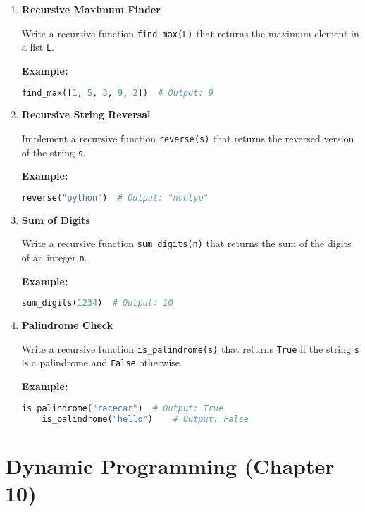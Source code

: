 \documentclass{article}
\begin{document}
\begin{enumerate}
    \item \textbf{Recursive Maximum Finder}

    Write a recursive function \texttt{find\_max(L)} that returns the maximum element in a list \texttt{L}.

    \textbf{Example:}
    \begin{lstlisting}[language=Python]
    find_max([1, 5, 3, 9, 2])  # Output: 9
    \end{lstlisting}

    \item \textbf{Recursive String Reversal}

    Implement a recursive function \texttt{reverse(s)} that returns the reversed version of the string \texttt{s}.

    \textbf{Example:}
    \begin{lstlisting}[language=Python]
    reverse("python")  # Output: "nohtyp"
    \end{lstlisting}

    \item \textbf{Sum of Digits}

    Write a recursive function \texttt{sum\_digits(n)} that returns the sum of the digits of an integer \texttt{n}.

    \textbf{Example:}
    \begin{lstlisting}[language=Python]
    sum_digits(1234)  # Output: 10
    \end{lstlisting}

    \item \textbf{Palindrome Check}

    Write a recursive function \texttt{is\_palindrome(s)} that returns \texttt{True} if the string \texttt{s} is a palindrome and \texttt{False} otherwise.

    \textbf{Example:}
    \begin{lstlisting}[language=Python]
    is_palindrome("racecar")  # Output: True
    is_palindrome("hello")    # Output: False
    \end{lstlisting}
\end{enumerate}

\section*{Dynamic Programming (Chapter 10)}
\end{document}
